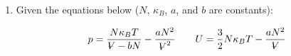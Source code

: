 \documentclass[10pt]{article}
\newenvironment{Solution}
    {\textbf{Solution:}
    
    \vspace{5mm}
    \begin{tcolorbox}
    }
    {
    \end{tcolorbox}
    \vspace{5mm}
    }
\newcommand{\vol}{{\ooalign{\hfil$V$\hfil\cr\kern0.08em--\hfil\cr}}}
\begin{document}
\begin{enumerate}
\begin{enumerate}
\begin{Solution}
    \end{Solution}
    \newpage 

    \item Calculate the adiabatic compressibility (at constant $N$).
    
    \begin{Solution}    
    The adiabatic compressibility is given as,
    \begin{equation}
        \kappa_S = -\frac{1}{\vol}\left.\frac{\partial \vol}{\partial p}\right|_{S, N}
    \end{equation}
    The partial, $\left.\partial \vol/\partial p\right|_{S, N}$ is equivalent to $\left[\partial p/\partial \vol\right]_{S, N}^{-1}$, so
    \begin{equation}
        \left.\frac{\partial \vol}{\partial p}\right|_{S, N} = \left[-\beta\left(\beta-1\right) S^{\alpha} \vol^{\beta-2} N^\gamma \right]^{-1}
    \end{equation}
    Thus,
    \begin{align}
        \kappa_S &= -\frac{1}{\vol}\left.\frac{\partial \vol}{\partial p}\right|_{S, N} = -\frac{1}{\vol \left[-\beta\left(\beta-1\right) S^{\alpha} \vol^{\beta-2} N^\gamma \right]}\\
        &= \frac{-1}{-\beta\left(\beta-1\right)S^{\alpha} \vol^{\beta-1} N^\gamma}\\
        &\boxed{=\frac{-1}{p\left(\beta-1\right)}
        }
    \end{align}
    \end{Solution}
    
    \item Based on the sign of these response functions (assume $C_v \geq 0$, $\kappa_s \geq 0$, we will prove this later), find inequalities for $\alpha$ and $\beta$.
    
    \begin{Solution}    
    If $\kappa_s \geq 0$, then . If $C_v \geq 0$, then . 
    
    \end{Solution}
\newpage 

\end{enumerate}

\item Given the equations below ($N$, $\kappa_B$, $a$, and $b$ are constants):

\begin{equation}
    p = \frac{N\kappa_B T}{\vol -b N}-\frac{a N^2}{\vol^2} \qquad U = \frac{3}{2} N \kappa_B T - \frac{a N^2}{\vol}
\end{equation}


\end{enumerate}
\end{document}
